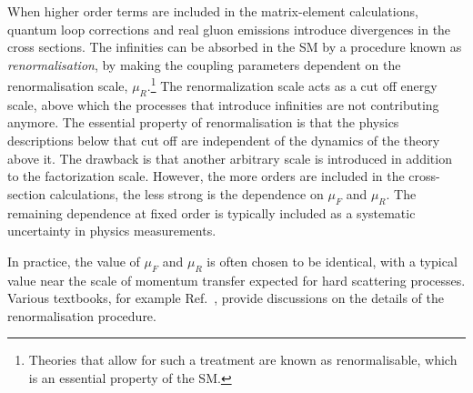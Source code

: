 When higher order terms are included in the matrix-element calculations, quantum loop corrections and real gluon emissions introduce divergences in the cross sections. 
The infinities can be absorbed in the SM by a procedure known as \emph{renormalisation}, by making the coupling parameters dependent on the renormalisation scale, $\mu_R$.\footnote{Theories that allow for such a treatment are known as renormalisable, which is an essential property of the SM.}
The renormalization scale acts as a cut off energy scale, above which the processes that introduce infinities are not contributing anymore. 
The essential property of renormalisation is that the physics descriptions below that cut off are independent of the dynamics of the theory above it. 
The drawback is that another arbitrary scale is introduced in addition to the factorization scale.
However, the more orders are included in the cross-section calculations, the less strong is the dependence on $\mu_F$ and $\mu_R$. 
The remaining dependence at fixed order is typically included as a systematic uncertainty in physics measurements.

In practice, the value of $\mu_F$ and $\mu_R$ is often chosen to be identical, with a typical value near the scale of momentum transfer expected for hard scattering processes.
Various textbooks, for example Ref.~\cite{Peskin:1995ev}, provide discussions on the details of the renormalisation procedure.

